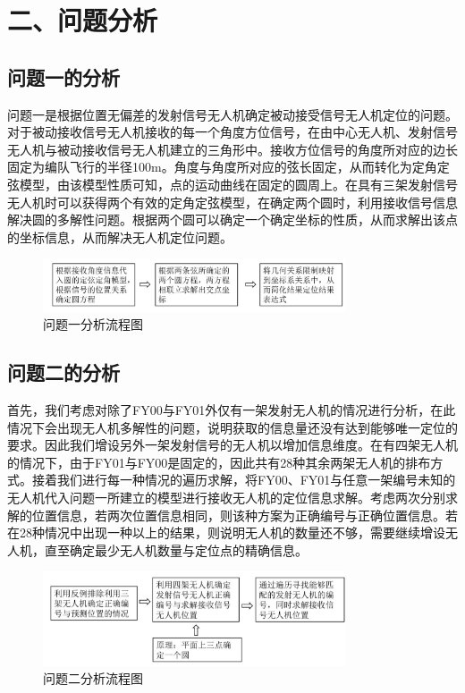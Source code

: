 \documentclass{my_paper}
\begin{document}
\section{二、问题分析}
\subsection{问题一的分析}
问题一是根据位置无偏差的发射信号无人机确定被动接受信号无人机定位的问题。对于被动接收信号无人机接收的每一个角度方位信号，在由中心无人机、发射信号无人机与被动接收信号无人机建立的三角形中。接收方位信号的角度所对应的边长固定为编队飞行的半径100m。角度与角度所对应的弦长固定，从而转化为定角定弦模型，由该模型性质可知，点的运动曲线在固定的圆周上。在具有三架发射信号无人机时可以获得两个有效的定角定弦模型，在确定两个圆时，利用接收信号信息解决圆的多解性问题。根据两个圆可以确定一个确定坐标的性质，从而求解出该点的坐标信息，从而解决无人机定位问题。

\begin{figure}[h]
    \centering
    \includegraphics[width=0.8\textwidth]{liuchengtu1.jpg}
    \caption{问题一分析流程图}
    \label{liuchengtu1}
\end{figure}

\subsection{问题二的分析}

首先，我们考虑对除了FY00与FY01外仅有一架发射无人机的情况进行分析，在此情况下会出现无人机多解性的问题，说明获取的信息量还没有达到能够唯一定位的要求。因此我们增设另外一架发射信号的无人机以增加信息维度。在有四架无人机的情况下，由于FY01与FY00是固定的，因此共有28种其余两架无人机的排布方式。接着我们进行每一种情况的遍历求解，将FY00、FY01与任意一架编号未知的无人机代入问题一所建立的模型进行接收无人机的定位信息求解。考虑两次分别求解的位置信息，若两次位置信息相同，则该种方案为正确编号与正确位置信息。若在28种情况中出现一种以上的结果，则说明无人机的数量还不够，需要继续增设无人机，直至确定最少无人机数量与定位点的精确信息。

\begin{figure}[h]
    \centering
    \includegraphics[width=0.8\textwidth]{liuchengtu2.jpg}
    \caption{问题二分析流程图}
    \label{liuchengtu2}
\end{figure}
\end{document}
